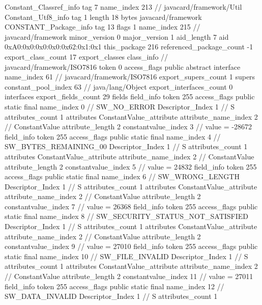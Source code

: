 {{{		}
		Constant_Classref_info {
			tag	7
			name_index	213		// javacard/framework/Util
		}
		Constant_Utf8_info {
			tag	1
			length	18
			bytes	javacard/framework
		}
		CONSTANT_Package_info {
			tag	13
			flags	1
			name_index	215		// javacard/framework
			minor_version	0
			major_version	1
			aid_length	7
			aid	0xA0:0x0:0x0:0x0:0x62:0x1:0x1
		}
	}
	this_package	216
	referenced_package_count	-1
	export_class_count	17
	export_classes {
		class_info {		// javacard/framework/ISO7816
			token	0
			access_flags	public abstract interface
			name_index	61		// javacard/framework/ISO7816
			export_supers_count	1
			supers {
				constant_pool_index	63		// java/lang/Object
			}
			export_interfaces_count	0
			interfaces {
			}
			export_fields_count	29
			fields {
			field_info {
				token	255
				access_flags	public static final
				name_index	0		// SW_NO_ERROR
				Descriptor_Index	1		// S
				attributes_count	1
				attributes {
				ConstantValue_attribute {
					attribute_name_index	2		// ConstantValue
					attribute_length	2
					constantvalue_index	3		// value = -28672
				}
				}
			}
			field_info {
				token	255
				access_flags	public static final
				name_index	4		// SW_BYTES_REMAINING_00
				Descriptor_Index	1		// S
				attributes_count	1
				attributes {
				ConstantValue_attribute {
					attribute_name_index	2		// ConstantValue
					attribute_length	2
					constantvalue_index	5		// value = 24832
				}
				}
			}
			field_info {
				token	255
				access_flags	public static final
				name_index	6		// SW_WRONG_LENGTH
				Descriptor_Index	1		// S
				attributes_count	1
				attributes {
				ConstantValue_attribute {
					attribute_name_index	2		// ConstantValue
					attribute_length	2
					constantvalue_index	7		// value = 26368
				}
				}
			}
			field_info {
				token	255
				access_flags	public static final
				name_index	8		// SW_SECURITY_STATUS_NOT_SATISFIED
				Descriptor_Index	1		// S
				attributes_count	1
				attributes {
				ConstantValue_attribute {
					attribute_name_index	2		// ConstantValue
					attribute_length	2
					constantvalue_index	9		// value = 27010
				}
				}
			}
			field_info {
				token	255
				access_flags	public static final
				name_index	10		// SW_FILE_INVALID
				Descriptor_Index	1		// S
				attributes_count	1
				attributes {
				ConstantValue_attribute {
					attribute_name_index	2		// ConstantValue
					attribute_length	2
					constantvalue_index	11		// value = 27011
				}
				}
			}
			field_info {
				token	255
				access_flags	public static final
				name_index	12		// SW_DATA_INVALID
				Descriptor_Index	1		// S
				attributes_count	1
}}}}}
